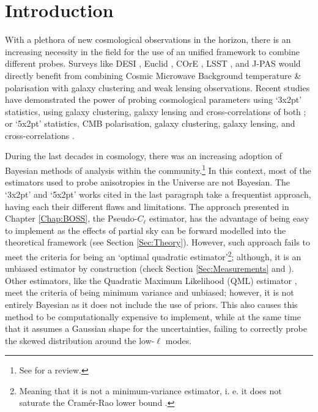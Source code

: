 \section{Introduction}
With a plethora of new cosmological observations in the horizon, there is an increasing necessity in the field for the use of an unified framework to combine different probes. Surveys like DESI \citep{2016-DESI}, Euclid \citep{2011EuclidRedPaper}, COrE \citep{2011CoRE}, LSST \citep{LSST}, and J-PAS \citep{JPAS} would directly benefit from combining Cosmic Microwave Background temperature \& polarisation with galaxy clustering and weak lensing observations. Recent studies have demonstrated the power of probing cosmological parameters using `3x2pt' statistics, using galaxy clustering, galaxy lensing and cross-correlations of both \citep{2017MNRAS.465.1454H, 2017arXiv170801530D}; or `5x2pt' statistics, CMB polarisation, galaxy clustering, galaxy lensing, and cross-correlations \citep{2016Nicola, 2017Nicola, Doux2017}. 

\qquad During the last decades in cosmology, there was an increasing adoption of Bayesian methods of analysis within the community.\footnote{See \cite{2017TrottaReview} for a review.} In this context, most of the estimators used to probe anisotropies in the Universe are not Bayesian. The `3x2pt' and  `5x2pt' works cited in the last paragraph take a frequentist approach, having each their different flaws and limitations. The approach presented in Chapter \ref{Chap:BOSS}, the Pseudo-$C_{\ell}$ estimator, has the advantage of being easy to implement as the effects of partial sky can be forward modelled into the theoretical framework  (see Section \ref{Sec:Theory}). However, such approach fails to meet the criteria for being an `optimal quadratic estimator'\footnote{Meaning that it is not a minimum-variance estimator, i. e. it does not saturate the Cram\'er-Rao lower bound \citep{MR0015748,cramer2016mathematical}.}; although, it is an unbiased estimator by construction (check Section \ref{Sec:Measurements} and \cite{Peebles1973}). Other estimators, like the Quadratic Maximum Likelihood (QML) estimator \citep{1994Gorsky,1997Tegmark,Hobson2002,Efstat2004,Boris2013}, meet the criteria of being minimum variance and unbiased; however, it is not entirely Bayesian as it does not include the use of priors. This also causes this method to be computationally expensive to implement, while at the same time that it assumes a Gaussian shape for the uncertainties, failing to correctly probe the skewed distribution around the low-$\ell$ modes.

